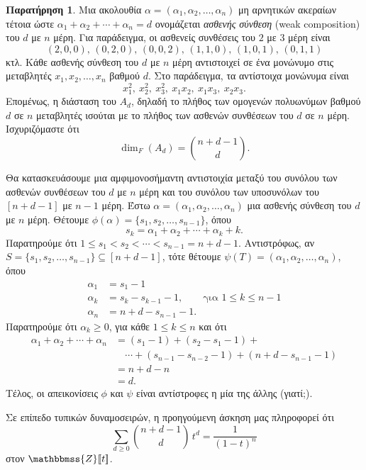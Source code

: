 \documentclass[12pt,a4paper,reqno]{amsart}
\theoremstyle{definition}
\newtheorem*{remark}{Παρατήρηση}
\newcommand{\ZZ}{\mathbbmss{Z}}
\begin{document}
\begin{remark}
Μια ακολουθία $\alpha = (\alpha_1, \alpha_2, \dots, \alpha_n)$ μη αρνητικών ακεραίων τέτοια ώστε $\alpha_1 + \alpha_2 + \cdots + \alpha_n = d$ ονομάζεται \emph{ασθενής σύνθεση} (weak composition) του $d$ με $n$ μέρη. Για παράδειγμα, οι ασθενείς συνθέσεις του $2$ με $3$ μέρη είναι 
\[
  (2,0,0), \, (0,2,0), \, (0,0,2), \, (1,1,0), \, (1,0,1), \, (0,1,1)
\]
κτλ. Κάθε ασθενής σύνθεση του $d$ με $n$ μέρη αντιστοιχεί σε ένα μονώνυμο στις μεταβλητές $x_1, x_2, \dots, x_n$ βαθμού $d$. Στο παράδειγμα, τα αντίστοιχα μονώνυμα είναι 
\[
  x_1^2, \ x_2^2, \ x_3^2, \ x_1x_2, \ x_1x_3, \ x_2x_3.
\]
Επομένως, η διάσταση του $A_d$, δηλαδή το πλήθος των ομογενών πολυωνύμων βαθμού $d$ σε $n$ μεταβλητές ισούται με το πλήθος των ασθενών συνθέσεων του $d$ σε $n$ μέρη. Ισχυριζόμαστε ότι 
\[
\dim_F(A_d) = \binom{n + d - 1}{d}.
\]

Θα κατασκευάσουμε μια αμφιμονοσήμαντη αντιστοιχία μεταξύ του συνόλου των ασθενών συνθέσεων του $d$ με $n$ μέρη και του συνόλου των υποσυνόλων του $[n+d-1]$ με $n-1$ μέρη. Έστω $\alpha = (\alpha_1, \alpha_2, \dots, \alpha_n)$ μια ασθενής σύνθεση του $d$ με $n$ μέρη. Θέτουμε $\phi(\alpha) = \{s_1, s_2, \dots, s_{n-1}\}$, όπου 
\[
s_k = \alpha_1 + \alpha_2 + \cdots + \alpha_k + k.
\]
Παρατηρούμε ότι $1 \le s_1 < s_2 < \cdots < s_{n-1} = n+d-1$. Αντιστρόφως, αν $S = \{s_1, s_2, \dots, s_{n-1}\} \subseteq [n+d-1]$, τότε θέτουμε $\psi(T) = (\alpha_1, \alpha_2, \dots, \alpha_n)$, όπου 
\begin{align*}
  \alpha_1 &= s_1 - 1 \\
  \alpha_k &= s_k - s_{k-1} -1, \qquad \text{για $1 \le k \le n-1$} \\ 
  \alpha_n &= n + d - s_{n-1} - 1.
\end{align*}
Παρατηρούμε ότι $\alpha_k \ge 0$, για κάθε $1 \le k \le n$ και ότι 
\begin{align*}  
  \alpha_1 + \alpha_2 + \cdots + \alpha_n &= (s_1 - 1) + (s_2 - s_1 - 1) + \\ 
  &\quad \cdots + (s_{n-1} - s_{n-2} - 1) + (n + d - s_{n-1} - 1) \\
  &= n + d - n \\ 
  &= d.
\end{align*} 
Τέλος, οι απεικονίσεις $\phi$ και $\psi$ είναι αντίστροφες η μία της άλλης (γιατί;). 

Σε επίπεδο τυπικών δυναμοσειρών, η προηγούμενη άσκηση μας πληροφορεί ότι 
\[
\sum_{d \ge 0} \binom{n+d-1}{d} \, t^d = \frac{1}{(1-t)^n}
\]
στον $\ZZ[\![t]\!]$.
\end{remark}
\end{document}
